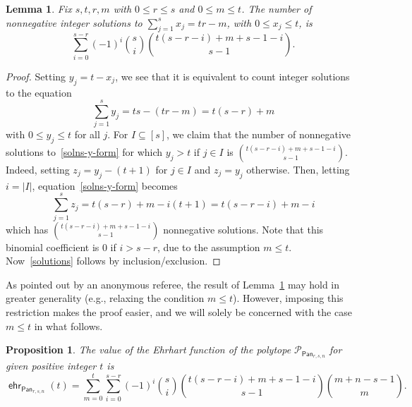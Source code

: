\documentclass[11pt]{amsart}
\newtheorem{proposition}[theorem]{Proposition}
\newtheorem{lemma}[theorem]{Lemma}
\theoremstyle{definition}
\newcommand{\0}{\emptyset}
\newcommand{\Po}{\mathcal{P}}
\DeclareMathOperator{\ehr}{\mathsf{ehr}}
\DeclareMathOperator{\Pan}{\mathsf{Pan}} %
\newcommand{\JLM}[1]{\par \noindent
  \framebox{\begin{minipage}[c]{0.95 \textwidth}\color{blue} Jeremy Note:
      #1 \end{minipage}\color{blue}}\par}
\newcommand{\MY}[1]{\par \noindent
  \framebox{\begin{minipage}[c]{0.95 \textwidth}\color{orange} Mei Note:
      #1 \end{minipage}\color{red}}\par}
\begin{document}
\begin{lemma}\label{lemma:intsolutions}
Fix $s,t,r,m$ with $0\leq r \leq s$ and $0\leq m \leq t$.
The number of nonnegative integer solutions to $\sum_{j=1}^sx_j = tr-m$, with $0\leq x_j\leq t$, is
\begin{equation}\label{solutions}
\sum_{i=0}^{s-r} (-1)^i \binom{s}{i} \binom{t(s-r-i)+m+s-1-i}{s-1}.
\end{equation}
\end{lemma}

\begin{proof}
Setting $y_j=t-x_j$, we see that it is equivalent to count integer solutions to the equation
\begin{equation} \label{solns-y-form}
\sum_{j=1}^sy_j = ts - (tr-m)=t(s-r)+m
\end{equation}
with $0\leq y_j\leq t$ for all $j$. 
For $I\subseteq [s]$, we claim that the number of nonnegative solutions to~\eqref{solns-y-form} for which $y_j>t$ if $j\in I$ is $\binom{t(s-r-i)+m+s-1-i}{s-1}$.
Indeed, setting $z_j=y_j-(t+1)$ for $j\in I$ and $z_j=y_j$ otherwise. 
Then, letting $i=|I|$, equation~\eqref{solns-y-form} becomes
\[\sum_{j=1}^sz_j = t(s-r)+m-i(t+1)=t(s-r-i)+m-i\]
which has $\binom{t(s-r-i)+m+s-1-i}{s-1}$ nonnegative solutions. Note that this binomial coefficient is 0 if $i>s-r$, due to the assumption $m\leq t$.
Now~\eqref{solutions} follows by inclusion/exclusion. 
\end{proof}

As pointed out by an anonymous referee, the result of Lemma~\ref{lemma:intsolutions} may hold in greater generality (e.g., relaxing the condition $m\leq t$).  However, imposing this restriction makes the proof easier, and we will solely be concerned with the case $m\leq t$ in what follows.

\begin{proposition}\label{prop:Ehrhart-panhandle}
The value of the Ehrhart function of the polytope $\Po_{\Pan_{r,s,n}}$ for given positive integer $t$ is
\[
    \ehr_{{\Pan_{r,s,n}}}(t)=\sum_{m=0}^t\sum_{i=0}^{s-r}(-1)^i\binom{s}{i}\binom{t(s-r-i)+m+s-1-i}{s-1}\binom{m+n-s-1}{m}.
\]
\end{proposition}
\end{document}
